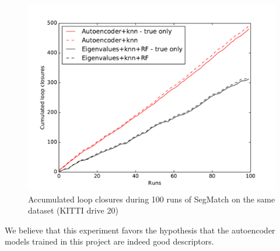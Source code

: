 \begin{figure}
  \centering
  \includegraphics[width=5.2in]{images/kitti20performance.pdf}
  \caption{Accumulated loop closures during 100 runs of SegMatch on the same dataset (KITTI drive 20)}
  \label{fig:kitti20_performance}
\end{figure}

We believe that this experiment favors the hypothesis that the autoencoder models trained in this project are indeed good descriptors.\\

